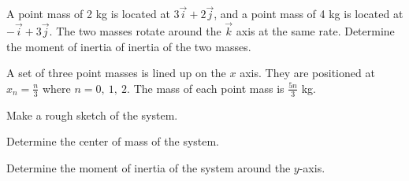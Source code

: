 
\begin{problem}
\item A point mass of 2 kg is located at $3\vec{i} + 2\vec{j}$, and a
  point mass of 4 kg is located at $-\vec{i}+3\vec{j}$. The two masses
  rotate around the $\vec{k}$ axis at the same rate. Determine the
  moment of inertia of inertia of the two masses.

  \vfill

  \clearpage


\item A set of three point masses is lined up on the $x$ axis. They are
  positioned at $x_n=\frac{n}{3}$ where $n=0,~1,~2$. The mass of
  each point mass is $\frac{5n}{3}$ kg.
  \begin{subproblem}
    \item Make a rough sketch of the system.
      \vfill
    \item Determine the center of mass of the system.
      \vfill
    \item Determine the moment of inertia of the system around the
      $y$-axis.
      \vfill
  \end{subproblem}


\end{problem}



